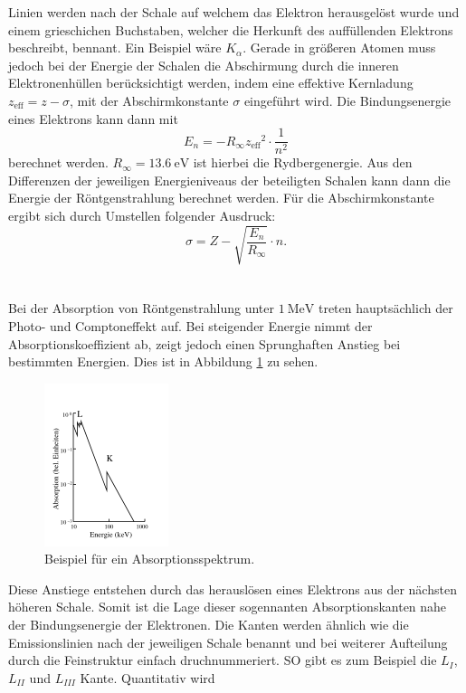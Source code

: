 Linien werden nach der Schale auf welchem das Elektron herausgelöst wurde und einem grieschichen Buchstaben, welcher die Herkunft des auffüllenden Elektrons beschreibt, bennant.
Ein Beispiel wäre $K_{\alpha}$. Gerade in größeren Atomen muss jedoch bei der Energie der Schalen die Abschirmung durch die inneren Elektronenhüllen berücksichtigt werden, indem
eine effektive Kernladung $z_\text{eff}= z - \sigma$, mit der Abschirmkonstante $\sigma$ eingeführt wird. Die Bindungsenergie eines Elektrons kann dann mit
\begin{equation}
  E_n = - R_{\infty} {z_\text{eff}}^2 \cdot \frac{1}{n^2}
  \label{eqn:En}
\end{equation}
berechnet werden. $R_{\infty} = \SI{13.6}{\electronvolt}$ ist hierbei die Rydbergenergie. Aus den Differenzen der jeweiligen Energieniveaus der beteiligten Schalen kann dann die
Energie der Röntgenstrahlung berechnet werden.
Für die Abschirmkonstante ergibt sich durch Umstellen folgender Ausdruck:
\begin{equation}
  \sigma = Z-\sqrt{\frac{E_n}{R_{\infty}}}\cdot n .
  \label{eqn:sigma}
\end{equation} \\\\
Bei der Absorption von Röntgenstrahlung unter $\SI{1}{\mega\electronvolt}$ treten hauptsächlich der Photo- und Comptoneffekt auf. Bei steigender Energie nimmt der Absorptionskoeffizient
ab, zeigt jedoch einen Sprunghaften Anstieg bei bestimmten Energien. Dies ist in Abbildung \ref{fig:absorption} zu sehen.
\begin{figure}
  \centering
  \includegraphics{images/absorption.png}
  \caption{Beispiel für ein Absorptionsspektrum.\cite{sample}}
  \label{fig:absorption}
\end{figure}
Diese Anstiege entstehen durch das herauslösen eines Elektrons aus der nächsten höheren Schale.
Somit ist die Lage dieser sogennanten Absorptionskanten nahe der Bindungsenergie der Elektronen. Die Kanten werden ähnlich wie die Emissionslinien nach der jeweiligen Schale
benannt und bei weiterer Aufteilung durch die Feinstruktur einfach druchnummeriert. SO gibt es zum Beispiel die $L_I$, $L_{II}$ und $L_{III}$ Kante. Quantitativ wird
